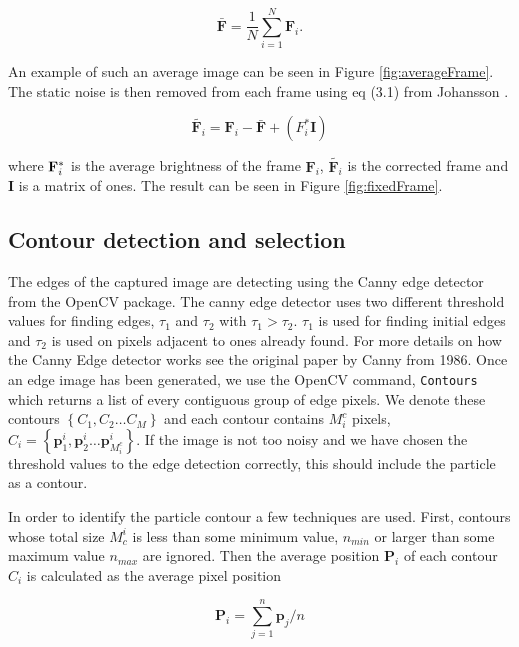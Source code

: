 \begin{equation}\label{eq:averageFrame}
\bar{\mathbf{F}} = \frac{1}{N}\sum\limits_{i=1}^{N} \mathbf{F}_i.
\end{equation}

An example of such an average image can be seen in Figure \ref{fig:averageFrame}. The static noise is then removed from each frame using eq (3.1) from Johansson \cite{AntonThesis}.

\begin{equation}
\widetilde{\mathbf{F}_{i}} = \mathbf{F}_i - \bar{\mathbf{F}} + (F_i^*\mathbf{I})
\end{equation}

\noindent where $\mathbf{F}_i^*$ is the average brightness of the frame $\mathbf{F}_i$, $\widetilde{\mathbf{F}_{i}}$ is the corrected frame and $\mathbf{I}$ is a matrix of ones. The result can be seen in Figure \ref{fig:fixedFrame}. 




\subsection{Contour detection and selection}
The edges of the captured image are detecting using the Canny edge detector from the OpenCV package. The canny edge detector uses two different threshold values for finding edges, $\tau_1$ and $\tau_2$ with $\tau_1 > \tau_2$. $\tau_1$ is used for finding initial edges and $\tau_2$ is used on pixels adjacent to ones already found. For more details on how the Canny Edge detector works see the original paper by Canny from 1986\cite{Canny}. Once an edge image has been generated, we use the OpenCV command, \texttt{Contours} which returns a list of every contiguous group of edge pixels.  We denote these contours $\left\{C_1, C_2 \ldots C_M \right\}$ and each contour contains $M^c_i$ pixels, $C_i = \left\{\mathbf{p}^i_1, \mathbf{p}^i_2 \ldots \mathbf{p}^i_{M^c_i}\right\} $. If the image is not too noisy and we have chosen the threshold values to the edge detection correctly, this should include the particle as a contour. 

In order to identify the particle contour  a few techniques are used. First, contours whose total size $ M_c^i$ is less than some minimum value, $ n_{min}$ or larger than some maximum value $n_{max}$ are ignored. Then the average position $\mathbf{P}_i$ of each contour $C_i$ is calculated as the average pixel position

\[
\mathbf{P}_i = \sum_{j=1}^n \mathbf{p}_j/n
\]

